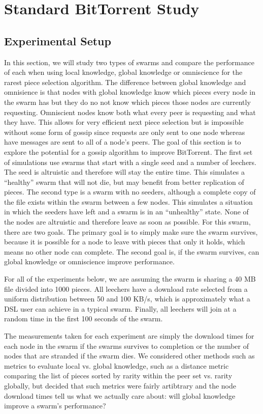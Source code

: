 \section{Standard BitTorrent Study}

\subsection{Experimental Setup}

In this section, we will study two types of swarms and compare the
performance of each when using local knowledge, global knowledge or 
omniscience for the rarest piece selection algorithm. The difference
between global knowledge and omnisience is that nodes with global
knowledge know which pieces every node in the swarm has but they do
no not know which pieces those nodes are currently
requesting. Omniscient nodes know both what every peer is requesting
and what they have. This allows for very efficient next piece
selection but is impossible without some form of gossip since requests
are only sent to one node whereas have messages are sent to all of a
node's peers. The goal of this section is to explore the potential for
a gossip algorithm to improve BitTorrent. The first set of simulations
use swarms that start with a single seed and a number of leechers.
The seed is altruistic and therefore will stay the entire time. This 
simulates a ``healthy'' swarm that will not die, but may benefit from 
better replication of pieces. The second type is a swarm with no seeders, 
although a complete copy of the file exists within the swarm between a
few nodes. This simulates a situation in which the seeders have left
and a swarm is in an ``unhealthy'' state. None of the nodes are
altruistic and therefore leave as soon as possible. For this swarm,
there are two goals. The primary goal is to simply make sure the swarm
survives, because it is possible for a node to leave with pieces that
only it holds, which means no other node can complete. The second goal
is, if the swarm survives, can global knowledge or omniscience improve 
performance.

For all of the experiments below, we are assuming the swarm is sharing a
40 MB file divided into 1000 pieces. All leechers have a download rate
selected from a uniform distribution between 50 and 100 KB/s, which is
approximately what a DSL user can achieve in a typical swarm. Finally, all
leechers will join at a random time in the first 100 seconds of the swarm.

The measurements taken for each experiment are simply the download times for
each node in the swarm if the swarms survives to completion or the
number of nodes that are stranded if the swarm dies. We considered
other methods such as metrics to evaluate local vs. global knowledge,
such as a distance metric comparing the list of pieces sorted by
rarity within the peer set vs. rarity globally, but decided that such
metrics were fairly artibtrary and the node download times tell us
what we actually care about: will global knowledge improve a swarm's
performance?

